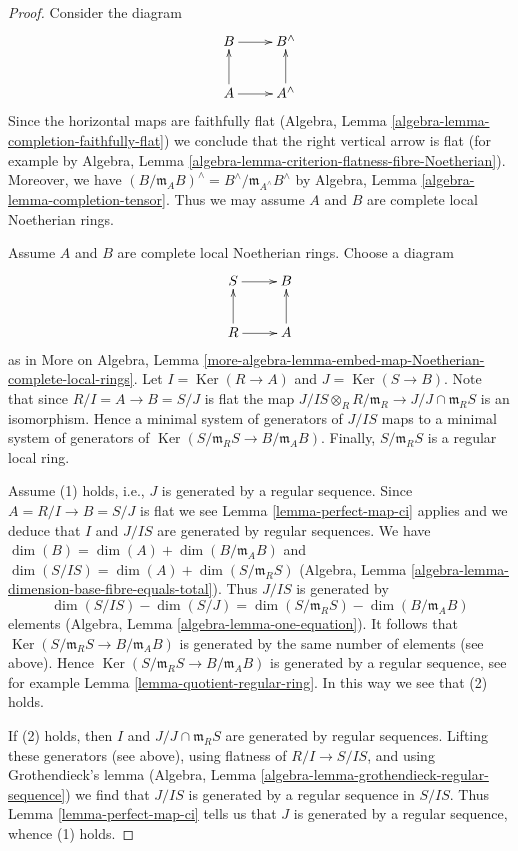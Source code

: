 \documentclass{stacks-project}
\theoremstyle{plain}
\theoremstyle{definition}
\theoremstyle{remark}
\numberwithin{equation}{subsection}
\def\Ker{\mathop{\mathrm{Ker}}}
\begin{document}
\begin{proof}
Consider the diagram
$$
\xymatrix{
B \ar[r] & B^\wedge \\
A \ar[u] \ar[r] & A^\wedge \ar[u]
}
$$
Since the horizontal maps are faithfully flat
(Algebra, Lemma \ref{algebra-lemma-completion-faithfully-flat})
we conclude that the right vertical arrow is flat
(for example by Algebra, Lemma
\ref{algebra-lemma-criterion-flatness-fibre-Noetherian}).
Moreover, we have
$(B/\mathfrak m_A B)^\wedge = B^\wedge/\mathfrak m_{A^\wedge} B^\wedge$
by Algebra, Lemma \ref{algebra-lemma-completion-tensor}.
Thus we may assume $A$ and $B$ are complete local Noetherian rings.

\medskip\noindent
Assume $A$ and $B$ are complete local Noetherian rings.
Choose a diagram
$$
\xymatrix{
S \ar[r] & B \\
R \ar[u] \ar[r] & A \ar[u]
}
$$
as in More on Algebra, Lemma
\ref{more-algebra-lemma-embed-map-Noetherian-complete-local-rings}.
Let $I = \Ker(R \to A)$ and $J = \Ker(S \to B)$.
Note that since $R/I = A \to B = S/J$ is flat the map
$J/IS \otimes_R R/\mathfrak m_R \to J/J \cap \mathfrak m_R S$
is an isomorphism. Hence a minimal system of generators of $J/IS$
maps to a minimal system of generators of
$\Ker(S/\mathfrak m_R S \to B/\mathfrak m_A B)$.
Finally, $S/\mathfrak m_R S$ is a regular local ring.

\medskip\noindent
Assume (1) holds, i.e., $J$ is generated by a regular sequence.
Since $A = R/I \to B = S/J$ is flat we see
Lemma \ref{lemma-perfect-map-ci} applies and we deduce
that $I$ and $J/IS$ are generated by regular sequences.
We have $\dim(B) = \dim(A) + \dim(B/\mathfrak m_A B)$ and
$\dim(S/IS) = \dim(A) + \dim(S/\mathfrak m_R S)$
(Algebra, Lemma \ref{algebra-lemma-dimension-base-fibre-equals-total}).
Thus $J/IS$ is generated by
$$
\dim(S/IS) - \dim(S/J) = \dim(S/\mathfrak m_R S) - \dim(B/\mathfrak m_A B)
$$
elements (Algebra, Lemma \ref{algebra-lemma-one-equation}).
It follows that $\Ker(S/\mathfrak m_R S \to B/\mathfrak m_A B)$
is generated by the same number of elements (see above).
Hence $\Ker(S/\mathfrak m_R S \to B/\mathfrak m_A B)$
is generated by a regular sequence, see for example
Lemma \ref{lemma-quotient-regular-ring}.
In this way we see that (2) holds.

\medskip\noindent
If (2) holds, then $I$ and $J/J \cap \mathfrak m_RS$
are generated by regular sequences. Lifting these generators
(see above), using flatness of $R/I \to S/IS$,
and using Grothendieck's lemma
(Algebra, Lemma \ref{algebra-lemma-grothendieck-regular-sequence})
we find that $J/IS$ is generated by a regular sequence in $S/IS$.
Thus Lemma \ref{lemma-perfect-map-ci} tells us that $J$
is generated by a regular sequence, whence (1) holds.
\end{proof}
\end{document}
